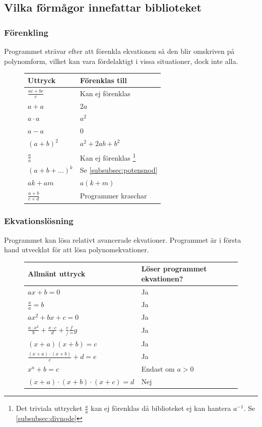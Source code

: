 \documentclass[12pt,a4paper]{article}
\begin{document}
\subsection{Vilka förmågor innefattar biblioteket}
\subsubsection{Förenkling}
Programmet strävar efter att förenkla ekvationen så den blir omskriven på polynomform, vilket kan vara fördelaktigt i vissa situationer, dock inte alla.
\begin{savenotes}
\begin{figure}[h!]
  \centering
  \begin{tabular}{l|l}
    \textbf{Uttryck} & \textbf{Förenklas till} \\
    \hline
    \(\frac{ac + bc}{c}\) & Kan ej förenklas \\
    \(a+a\) & \(2a\) \\
    \(a \cdot a\) & \(a^{2}\) \\
    \(a - a\) & \(0\) \\
    \((a+b)^{2}\) & \(a^{2} + 2ab + b^{2}\) \\
    \(\frac{a}{a}\) & Kan ej förenklas \footnote{Det triviala uttrycket \(\frac{a}{a}\) kan ej förenklas då biblioteket ej kan hantera \(a^{-1}\). Se \ref{subsubsec:divnode}} \\
    \((a+b+\ldots)^{k}\) & Se \ref{subsubsec:potensnod} \\
    \(ak+am\) & \(a(k+m)\) \\
    \(\frac{a+b}{c+d}\) & Programmer kraschar
  \end{tabular}
  \label{tab:expressions}
\end{figure}
\end{savenotes}

\subsubsection{Ekvationslösning}
Programmet kan lösa relativt avancerade ekvationer. Programmet är i första hand utvecklat för att lösa polynomekvationer.

\begin{figure}[h!]
  \centering
  \begin{tabular}{l|l}
    \textbf{Allmänt uttryck} & \textbf{Löser programmet ekvationen?} \\
    \hline
    \(ax+b=0\) & Ja \\
    \(\frac{x}{a}=b\) & Ja \\
    \(ax^2+bx+c=0\) & Ja \\
    \(\frac{a \cdot x^2}{b}+\frac{x \cdot c}{d}+\frac{e}/\frac{f}=g\) & Ja \\
    \((x+a)(x+b)=c\) & Ja \\
    \(\frac{(x+a)\cdot(x+b)}{c}+d=e\) & Ja \\
    \(x^a+b=c\) & Endast om \( a>0 \) \\
    \((x+a)\cdot(x+b)\cdot(x+c)=d\) & Nej 
  \end{tabular}
  \label{tab:lexer_patterns}
\end{figure}
\end{document}
